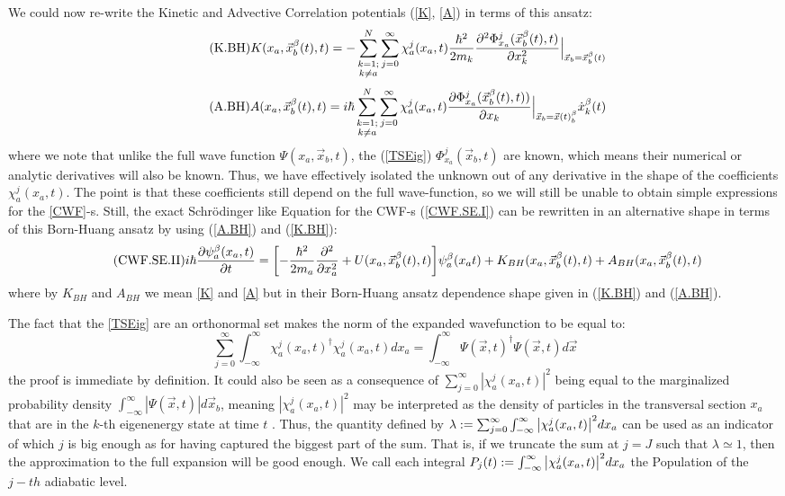 \documentclass[11pt, a4paper]{article} %
\begin{document}
We could now re-write the Kinetic and Advective Correlation potentials (\ref{K}, \ref{A}) in terms of this ansatz:
\begin{equation}\label{K.BH}\tag{K.BH}
K(x_a, \vec{x}_b^\beta(t), t) = -  \sum_{\substack{k=1; \\ k\neq a}}^{N} \sum_{j=0}^\infty \chi_a^j(x_a,t) \frac{\hbar^2}{2m_k} \pdv[2]{ \Phi_{x_a}^j(\vec{x}_b^\beta(t),t)}{x_k}\Big\rvert_{\vec{x}_b=\vec{x}_b^\beta(t)}
\end{equation}
\begin{equation}\label{A.BH}\tag{A.BH}
A(x_a, \vec{x}_b^\beta(t), t) =  i \hbar \sum_{\substack{k=1; \\ k\neq a}}^{N} \sum_{j=0}^\infty \chi_a^j(x_a,t) \pdv{ \Phi_{x_a}^j(\vec{x}_b^\beta(t),t))}{x_k}\Big\rvert_{\vec{x}_b=\vec{x}(t)_b^\beta} \dot{x}_k^\beta(t)
\end{equation}
where we note that unlike the full wave function $\Psi(x_a, \vec{x}_b,t)$, the (\ref{TSEig}) $\Phi_{x_a}^j(\vec{x}_b,t)$ are known, which means their numerical or analytic derivatives will also be known. Thus, we have effectively isolated the unknown out of any derivative in the shape of the coefficients $\chi^j_a(x_a,t)$. The point is that these coefficients still depend on the full wave-function, so we will still be unable to obtain simple expressions for the \ref{CWF}-s. Still, the exact Schrödinger like Equation for the CWF-s (\ref{CWF.SE.I}) can be rewritten in an alternative shape in terms of this Born-Huang ansatz by using (\ref{A.BH}) and (\ref{K.BH}):
\begin{equation}\label{CWF.SE.II}\tag{CWF.SE.II}
i\hbar \pdv{\psi_a^\beta(x_a, t)}{t} = \qty[- \frac{\hbar^2}{2m_a}\pdv[2]{}{x_a} + U(x_a, \vec{x}_b^\beta(t), t)]\psi_a^\beta(x_a t) + K_{BH}(x_a, \vec{x}_b^\beta(t), t) +A_{BH}(x_a, \vec{x}_b^\beta(t), t) 
\end{equation}
where by $ K_{BH}$ and $ A_{BH}$ we mean \ref{K} and \ref{A} but in their Born-Huang ansatz dependence shape given in (\ref{K.BH}) and (\ref{A.BH}).

The fact that the \ref{TSEig} are an orthonormal set makes the norm of the expanded wavefunction to be equal to:
$$
\sum_{j=0}^\infty \int_{-\infty}^\infty \chi_a^j(x_a,t)^\dagger \chi_a^j(x_a,t) dx_a = \int_{-\infty}^\infty \Psi(\vec{x},t)^\dagger \Psi(\vec{x},t)d\vec{x}
$$
the proof is immediate by definition. It could also be seen as a consequence of $\sum_{j=0}^\infty|\chi^j_a(x_a,t)|^2$ being equal to the marginalized probability density $\int_{-\infty}^\infty |\Psi(\vec{x},t)|d\vec{x}_b$, meaning $|\chi^j_a(x_a,t)|^2$ may be interpreted as the density of particles in the transversal section $x_a$ that are in the $k$-th eigenenergy state at time $t$ . Thus, the quantity defined by $\lambda:=\sum_{j=0}^\infty \int_{-\infty}^\infty \qty|\chi_a^j(x_a,t)|^2 dx_a$ can be used as an indicator of which $j$ is big enough as for having captured the biggest part of the sum. That is, if we truncate the sum at $j=J$ such that $\lambda\simeq 1$, then the approximation to the full expansion will be good enough. We call each integral $P_j(t):=\int_{-\infty}^\infty \qty|\chi_a^j(x_a,t)|^2 dx_a$ the Population of the $j-th$ adiabatic level.
\newpage
\end{document}

